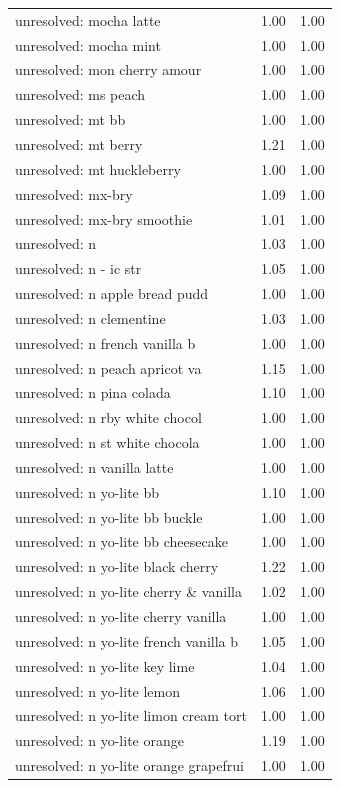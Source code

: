 \begin{table}
\begin{tabular}{lrr}
unresolved: mocha latte & 1.00 & 1.00 \\
unresolved: mocha mint & 1.00 & 1.00 \\
unresolved: mon cherry amour & 1.00 & 1.00 \\
unresolved: ms peach & 1.00 & 1.00 \\
unresolved: mt bb & 1.00 & 1.00 \\
unresolved: mt berry & 1.21 & 1.00 \\
unresolved: mt huckleberry & 1.00 & 1.00 \\
unresolved: mx-bry & 1.09 & 1.00 \\
unresolved: mx-bry smoothie & 1.01 & 1.00 \\
unresolved: n & 1.03 & 1.00 \\
unresolved: n - ic str & 1.05 & 1.00 \\
unresolved: n apple bread pudd & 1.00 & 1.00 \\
unresolved: n clementine & 1.03 & 1.00 \\
unresolved: n french vanilla b & 1.00 & 1.00 \\
unresolved: n peach apricot va & 1.15 & 1.00 \\
unresolved: n pina colada & 1.10 & 1.00 \\
unresolved: n rby white chocol & 1.00 & 1.00 \\
unresolved: n st white chocola & 1.00 & 1.00 \\
unresolved: n vanilla latte & 1.00 & 1.00 \\
unresolved: n yo-lite bb & 1.10 & 1.00 \\
unresolved: n yo-lite bb buckle & 1.00 & 1.00 \\
unresolved: n yo-lite bb cheesecake & 1.00 & 1.00 \\
unresolved: n yo-lite black cherry & 1.22 & 1.00 \\
unresolved: n yo-lite cherry \& vanilla & 1.02 & 1.00 \\
unresolved: n yo-lite cherry vanilla & 1.00 & 1.00 \\
unresolved: n yo-lite french vanilla b & 1.05 & 1.00 \\
unresolved: n yo-lite key lime & 1.04 & 1.00 \\
unresolved: n yo-lite lemon & 1.06 & 1.00 \\
unresolved: n yo-lite limon cream tort & 1.00 & 1.00 \\
unresolved: n yo-lite orange & 1.19 & 1.00 \\
unresolved: n yo-lite orange grapefrui & 1.00 & 1.00 \\

\end{tabular}
\end{table}
